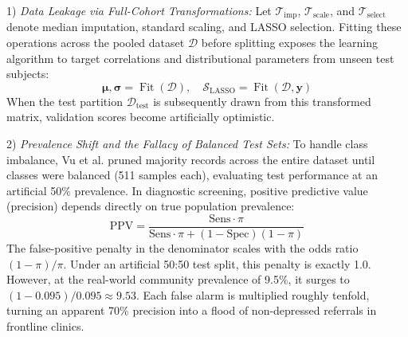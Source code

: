 \documentclass[conference]{IEEEtran}
\begin{document}
1) \textit{Data Leakage via Full-Cohort Transformations:} Let $\mathcal{T}_{\text{imp}}$, $\mathcal{T}_{\text{scale}}$, and $\mathcal{T}_{\text{select}}$ denote median imputation, standard scaling, and LASSO selection. Fitting these operations across the pooled dataset $\mathcal{D}$ before splitting exposes the learning algorithm to target correlations and distributional parameters from unseen test subjects:
\begin{equation}
\boldsymbol{\mu}, \boldsymbol{\sigma} = \operatorname{Fit}(\mathcal{D}), \quad \mathcal{S}_{\text{LASSO}} = \operatorname{Fit}(\mathcal{D}, \mathbf{y})
\end{equation}
When the test partition $\mathcal{D}_{\text{test}}$ is subsequently drawn from this transformed matrix, validation scores become artificially optimistic.

2) \textit{Prevalence Shift and the Fallacy of Balanced Test Sets:} To handle class imbalance, Vu et al. pruned majority records across the entire dataset until classes were balanced (511 samples each), evaluating test performance at an artificial 50\% prevalence. In diagnostic screening, positive predictive value (precision) depends directly on true population prevalence:
\begin{equation}
\text{PPV} = \frac{\text{Sens} \cdot \pi}{\text{Sens} \cdot \pi + (1 - \text{Spec})(1 - \pi)}
\end{equation}
The false-positive penalty in the denominator scales with the odds ratio $(1 - \pi) / \pi$. Under an artificial 50:50 test split, this penalty is exactly 1.0. However, at the real-world community prevalence of 9.5\%, it surges to $(1 - 0.095) / 0.095 \approx 9.53$. Each false alarm is multiplied roughly tenfold, turning an apparent 70\% precision into a flood of non-depressed referrals in frontline clinics.
\end{document}
